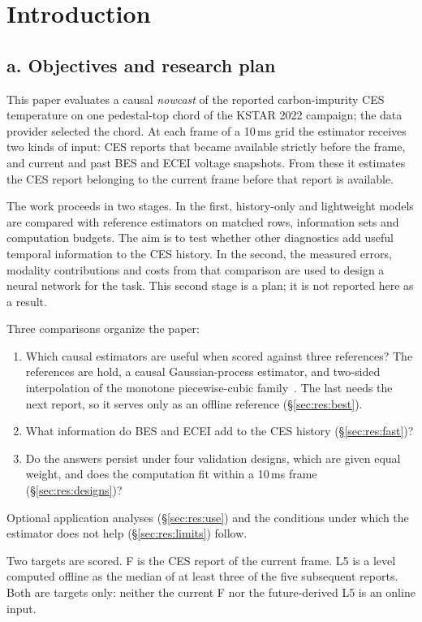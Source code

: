 \section{Introduction}
\label{sec:intro}

\subsection*{a. Objectives and research plan}
This paper evaluates a causal \emph{nowcast} of the reported carbon-impurity CES temperature on one pedestal-top chord of the KSTAR 2022 campaign; the data provider selected the chord. At each frame of a 10\,ms grid the estimator receives two kinds of input: CES reports that became available strictly before the frame, and current and past BES and ECEI voltage snapshots. From these it estimates the CES report belonging to the current frame before that report is available.

The work proceeds in two stages. In the first, history-only and lightweight models are compared with reference estimators on matched rows, information sets and computation budgets. The aim is to test whether other diagnostics add useful temporal information to the CES history. In the second, the measured errors, modality contributions and costs from that comparison are used to design a neural network for the task. This second stage is a plan; it is not reported here as a result.

Three comparisons organize the paper:
\begin{enumerate}\setlength{\itemsep}{1pt}\setlength{\parskip}{0pt}
\item Which causal estimators are useful when scored against three references? The references are hold, a causal Gaussian-process estimator, and two-sided interpolation of the monotone piecewise-cubic family~\citep{fritsch1980}. The last needs the next report, so it serves only as an offline reference (\S\ref{sec:res:best}).
\item What information do BES and ECEI add to the CES history (\S\ref{sec:res:fast})?
\item Do the answers persist under four validation designs, which are given equal weight, and does the computation fit within a 10\,ms frame (\S\ref{sec:res:designs})?
\end{enumerate}
Optional application analyses (\S\ref{sec:res:use}) and the conditions under which the estimator does not help (\S\ref{sec:res:limits}) follow.

Two targets are scored. F is the CES report of the current frame. L5 is a level computed offline as the median of at least three of the five subsequent reports. Both are targets only: neither the current F nor the future-derived L5 is an online input.

